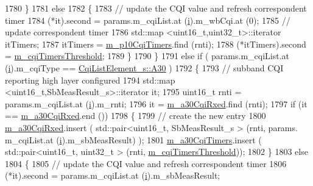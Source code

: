 \begin{DoxyCode}
1780             \}
1781           \textcolor{keywordflow}{else}
1782             \{
1783               \textcolor{comment}{// update the CQI value and refresh correspondent timer}
1784               (*it).second = params.m\_cqiList.at (\hyperlink{bernuolliDistribution_8m_a6f6ccfcf58b31cb6412107d9d5281426}{i}).m\_wbCqi.at (0);
1785               \textcolor{comment}{// update correspondent timer}
1786               std::map <uint16\_t,uint32\_t>::iterator itTimers;
1787               itTimers = \hyperlink{classns3_1_1CqaFfMacScheduler_a3ca7ca5692a1cc661ac68052dc595948}{m\_p10CqiTimers}.find (rnti);
1788               (*itTimers).second = \hyperlink{classns3_1_1CqaFfMacScheduler_ab2ea609b39ce10062f2bdd8027dd6edd}{m\_cqiTimersThreshold};
1789             \}
1790         \}
1791       \textcolor{keywordflow}{else} \textcolor{keywordflow}{if} ( params.m\_cqiList.at (\hyperlink{bernuolliDistribution_8m_a6f6ccfcf58b31cb6412107d9d5281426}{i}).m\_cqiType == \hyperlink{structns3_1_1CqiListElement__s_a8f1bd827fd9842e7c07e39265d88299aab9a9d64494e36c89d7932a00edb056a7}{CqiListElement\_s::A30} )
1792         \{
1793           \textcolor{comment}{// subband CQI reporting high layer configured}
1794           std::map <uint16\_t,SbMeasResult\_s>::iterator it;
1795           uint16\_t rnti = params.m\_cqiList.at (\hyperlink{bernuolliDistribution_8m_a6f6ccfcf58b31cb6412107d9d5281426}{i}).m\_rnti;
1796           it = \hyperlink{classns3_1_1CqaFfMacScheduler_a6894c40af99f8d6c6fdb201e7363fde9}{m\_a30CqiRxed}.find (rnti);
1797           \textcolor{keywordflow}{if} (it == \hyperlink{classns3_1_1CqaFfMacScheduler_a6894c40af99f8d6c6fdb201e7363fde9}{m\_a30CqiRxed}.end ())
1798             \{
1799               \textcolor{comment}{// create the new entry}
1800               \hyperlink{classns3_1_1CqaFfMacScheduler_a6894c40af99f8d6c6fdb201e7363fde9}{m\_a30CqiRxed}.insert ( std::pair<uint16\_t, SbMeasResult\_s > (rnti, params.
      m\_cqiList.at (\hyperlink{bernuolliDistribution_8m_a6f6ccfcf58b31cb6412107d9d5281426}{i}).m\_sbMeasResult) );
1801               \hyperlink{classns3_1_1CqaFfMacScheduler_ab6b356ca3bc799a5a1a51b7c687d87e4}{m\_a30CqiTimers}.insert ( std::pair<uint16\_t, uint32\_t > (rnti, 
      \hyperlink{classns3_1_1CqaFfMacScheduler_ab2ea609b39ce10062f2bdd8027dd6edd}{m\_cqiTimersThreshold}));
1802             \}
1803           \textcolor{keywordflow}{else}
1804             \{
1805               \textcolor{comment}{// update the CQI value and refresh correspondent timer}
1806               (*it).second = params.m\_cqiList.at (\hyperlink{bernuolliDistribution_8m_a6f6ccfcf58b31cb6412107d9d5281426}{i}).m\_sbMeasResult;

\end{DoxyCode}
